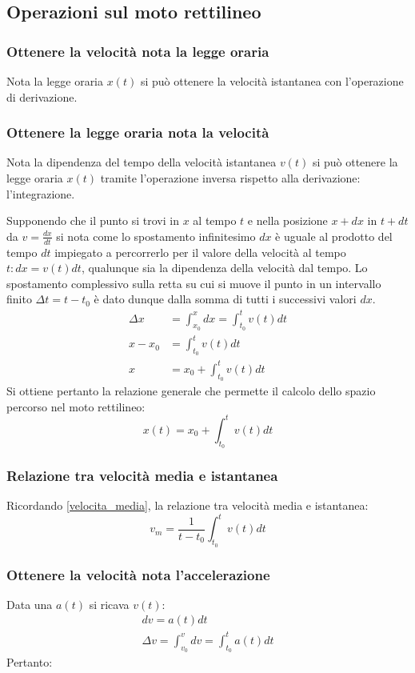 \documentclass[class=book, crop=false, oneside, 12pt]{standalone}
\begin{document}
  \subsection{Operazioni sul moto rettilineo}
    \subsubsection{Ottenere la velocit\`a nota la legge oraria}
    Nota la legge oraria $x(t)$ si pu\`o ottenere la velocit\`a istantanea con l'operazione di derivazione.
    \subsubsection{Ottenere la legge oraria nota la velocit\`a}
		Nota la dipendenza del tempo della velocit\`a istantanea $v(t)$ si pu\`o ottenere la legge oraria $x(t)$ tramite l'operazione inversa rispetto alla derivazione: l'integrazione.

		Supponendo che il punto si trovi in $x$ al tempo $t$ e nella posizione $x+dx$ in $t+dt$ da $v=\frac{dx}{dt}$ si nota come lo spostamento infinitesimo $dx$ \`e uguale al prodotto del tempo $dt$ impiegato a percorrerlo per il valore della velocit\`a al tempo $t:dx=v(t)dt$, qualunque sia la dipendenza della velocit\`a dal tempo.
		Lo spostamento complessivo sulla retta su cui si muove il punto in un intervallo finito $\Delta t = t - t_0$ \`e dato dunque dalla somma di tutti i successivi valori $dx$.
		\begin{align*}
			\Delta x &= \int_{x_0}^x dx = \int_{t_0}^t v(t)dt\\
			 x - x_0 &= \int_{t_0}^t v(t)dt\\
			       x &= x_0 +\int_{t_0}^tv(t)dt
		\end{align*}
		Si ottiene pertanto la relazione generale che permette il calcolo dello spazio percorso nel moto rettilineo:
		\begin{equation}
			x(t) = x_0 + \int_{t_0}^t v(t)dt
		\end{equation}

		\subsubsection{Relazione tra velocit\`a media e istantanea}
		Ricordando \eqref{velocita_media}, la relazione tra velocit\`a media e istantanea:
		\begin{equation*}
			v_m = \dfrac{1}{t-t_0}\int_{t_0}^{t}v(t)dt
		\end{equation*}
		\subsubsection{Ottenere la velocit\`a nota l'accelerazione}
		Data una $a(t)$ si ricava $v(t)$:
		\begin{gather*}
			dv = a(t)dt\\
			\Delta v = \int_{v_0}^v dv =\int_{t_0}^t a(t)dt
		\end{gather*}
		Pertanto:
\end{document}
